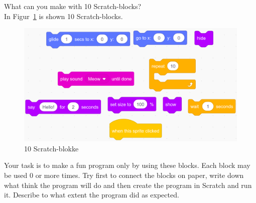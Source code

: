 What can you make with 10 Scratch-blocks?\\
In Figur~\ref{fig:blokke} is shown 10 Scratch-blocks.
\begin{figure}
  \centering
  \includegraphics[width=0.9\linewidth]{figures/Scratch3.png}
  \caption{10 Scratch-blokke}
  \label{fig:blokke}
\end{figure}
Your task is to make a fun program only by using these blocks. Each
block may be used 0 or more times. Try first to connect the blocks on
paper, write down what think the program will do and then create the
program in Scratch and run it. Describe to what extent the
program did as expected.
